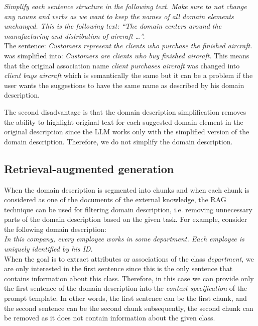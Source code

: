 \noindent{}\textit{Simplify each sentence structure in the following text. Make sure to not change any nouns and verbs as we want to keep the names of all domain elements unchanged. This is the following text: ``The domain centers around the manufacturing and distribution of aircraft \ldots''.} \\

\noindent{}The sentence: \textit{Customers represent the clients who purchase the finished aircraft.} was simplified into: \textit{Customers are clients who buy finished aircraft.} This means that the original association name \textit{client purchases aircraft} was changed into \textit{client buys aircraft} which is semantically the same but it can be a problem if the user wants the suggestions to have the same name as described by his domain description.

The second disadvantage is that the domain description simplification removes the ability to highlight original text for each suggested domain element in the original description since the LLM works only with the simplified version of the domain description. Therefore, we do not simplify the domain description.


\subsection{Retrieval-augmented generation}


When the domain description is segmented into chunks and when each chunk is considered as one of the documents of the external knowledge, the RAG technique can be used for filtering domain description, i.e. removing unnecessary parts of the domain description based on the given task. For example, consider the following domain description: \\

\noindent{}\textit{In this company, every employee works in some department. Each employee is uniquely identified by his ID.}\\

\noindent{}When the goal is to extract attributes or associations of the class \textit{department}, we are only interested in the first sentence since this is the only sentence that contains information about this class. Therefore, in this case we can provide only the first sentence of the domain description into the \emph{context specification} of the prompt template. In other words, the first sentence can be the first chunk, and the second sentence can be the second chunk subsequently, the second chunk can be removed as it does not contain information about the given class.


